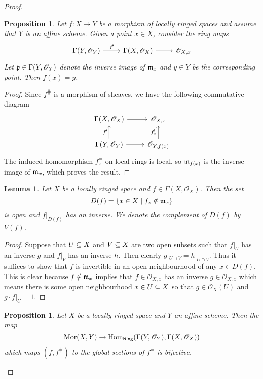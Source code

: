 \documentclass[11pt]{book}
\newtheorem{lemma}[theorem]{Lemma}
\newtheorem{proposition}[theorem]{Proposition}
\theoremstyle{definition}
\begin{document}
\begin{proof}
\begin{proposition}\label{scheme map to affine point image char}
Let $f:X\to Y$ be a morphism of locally ringed spaces and assume that $Y$ is an affine scheme. Given a point $x\in X$, consider the ring maps
\[\begin{tikzcd}
\Gamma(Y,\mathscr{O}_Y)\ar[r,"f^{\hash}"]&\Gamma(X,\mathscr{O}_X)\ar[r]&\mathscr{O}_{X,x}
\end{tikzcd}\]
Let $\mathfrak{p}\in\Gamma(Y,\mathscr{O}_Y)$ denote the inverse image of $\mathfrak{m}_x$ and $y\in Y$ be the corresponding point. Then $f(x)=y$.
\end{proposition}
\begin{proof}
Since $f^{\hash}$ is a morphism of sheaves, we have the following commutative diagram
\[\begin{tikzcd}
\Gamma(X,\mathscr{O}_X)\ar[r]&\mathscr{O}_{X,x}\\
\Gamma(Y,\mathscr{O}_Y)\ar[r]\ar[u,"f^{\hash}"]&\mathscr{O}_{Y,f(x)}\ar[u,,"f^{\hash}_x"]
\end{tikzcd}\]
The induced homomorphism $f^{\hash}_x$ on local rings is local, so $\mathfrak{m}_{f(x)}$ is the inverse image of $\mathfrak{m}_x$, which proves the result.
\end{proof}
\begin{lemma}\label{locally ringed global section zero set prop}
Let $X$ be a locally ringed space and $f\in\Gamma(X,\mathscr{O}_X)$. Then the set
\[D(f)=\{x\in X\mid f_x\notin\mathfrak{m}_x\}\]
is open and $f|_{D(f)}$ has an inverse. We denote the complement of $D(f)$ by $V(f)$.
\end{lemma}
\begin{proof}
Suppose that $U\subseteq X$ and $V\subseteq X$ are two open subsets such that $f|_U$ has an inverse $g$ and $f|_V$ has an inverse $h$. Then clearly $g|_{U\cap V}=h|_{U\cap V}$. Thus it suffices to show that $f$ is invertible in an open neighbourhood of any $x\in D(f)$. This is clear because $f\notin\mathfrak{m}_x$ implies that $f\in\mathscr{O}_{X,x}$ has an inverse $g\in\mathscr{O}_{X,x}$ which means there is some open neighbourhood $x\in U\subseteq X$ so that $g\in\mathscr{O}_{X}(U)$ and $g\cdot f|_U=1$.
\end{proof}
\begin{proposition}\label{locally ringed morphism to affine bijection}
Let $X$ be a locally ringed space and $Y$ an affine scheme. Then the map
\[\mathrm{Mor}(X,Y)\to\mathrm{Hom}_{\mathsf{Ring}}(\Gamma(Y,\mathscr{O}_Y),\Gamma(X,\mathscr{O}_X))\]
which maps $(f,f^{\hash})$ to the global sections of $f^{\hash}$ is bijective.

\end{proposition}
\end{proof}
\end{document}

